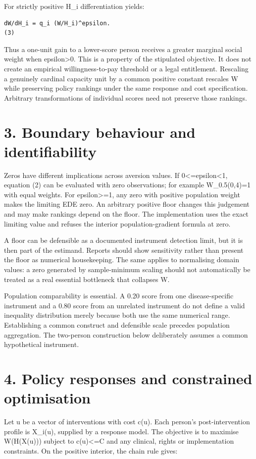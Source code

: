 \documentclass[11pt,a4paper]{article}
\begin{document}
For strictly positive H\_i differentiation yields:

{\footnotesize\begin{verbatim}
dW/dH_i = q_i (W/H_i)^epsilon.                                        (3)
\end{verbatim}}
Thus a one-unit gain to a lower-score person receives a greater marginal social weight when epsilon\textgreater{}0. This is a property of the stipulated objective. It does not create an empirical willingness-to-pay threshold or a legal entitlement. Rescaling a genuinely cardinal capacity unit by a common positive constant rescales W while preserving policy rankings under the same response and cost specification. Arbitrary transformations of individual scores need not preserve those rankings.

\section*{3. Boundary behaviour and identifiability}
Zeros have different implications across aversion values. If 0\textless{}=epsilon\textless{}1, equation (2) can be evaluated with zero observations; for example W\_0.5(0,4)=1 with equal weights. For epsilon\textgreater{}=1, any zero with positive population weight makes the limiting EDE zero. An arbitrary positive floor changes this judgement and may make rankings depend on the floor. The implementation uses the exact limiting value and refuses the interior population-gradient formula at zero.

A floor can be defensible as a documented instrument detection limit, but it is then part of the estimand. Reports should show sensitivity rather than present the floor as numerical housekeeping. The same applies to normalising domain values: a zero generated by sample-minimum scaling should not automatically be treated as a real essential bottleneck that collapses W.

Population comparability is essential. A 0.20 score from one disease-specific instrument and a 0.80 score from an unrelated instrument do not define a valid inequality distribution merely because both use the same numerical range. Establishing a common construct and defensible scale precedes population aggregation. The two-person construction below deliberately assumes a common hypothetical instrument.

\section*{4. Policy responses and constrained optimisation}
Let u be a vector of interventions with cost c(u). Each person's post-intervention profile is X\_i(u), supplied by a response model. The objective is to maximise W(H(X(u))) subject to c(u)\textless{}=C and any clinical, rights or implementation constraints. On the positive interior, the chain rule gives:
\end{document}
